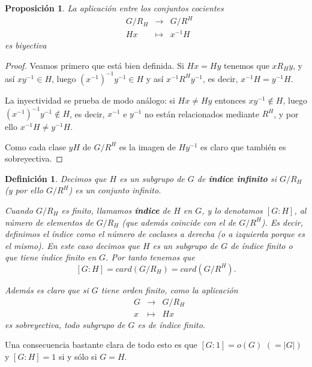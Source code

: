 \documentclass[12pt]{article}
\newtheorem{proposition}[theorem]{Proposición}
\newtheorem{definition}[theorem]{Definición}
\begin{document}
\begin{proposition}La aplicación entre los conjuntos cocientes $$
\begin{array}{rccl}
&G/R_H & \longrightarrow &G/R^H\\
&Hx& \longmapsto &x^{-1}H
\end{array}
$$ es biyectiva
\end{proposition}
\begin{proof}
Veamos primero que está bien definida. Si $Hx = Hy$ tenemos que $xR_Hy$, y así $xy^{-1} \in H$, luego $(x^{-1})^{-1}y^{-1} \in H$ y así $x^{-1}R^Hy^{-1}$, es decir, $x^{-1}H = y^{-1}H.$

La inyectividad se prueba de modo análogo: si $Hx \neq Hy$ entonces $xy^{-1} \notin  H$, luego $(x^{-1})^{-1}y^{-1} \notin H$, es decir, $x^{-1}$ e $y^{-1}$ no están relacionados mediante $R^H$, y por ello $x^{-1}H \neq y^{-1}H$.

Como cada clase $yH$ de $G/R^H$ es la imagen de $Hy^{-1}$ es claro que también es sobreyectiva.

\end{proof}

\begin{definition} \label{eq:indice} Decimos que $H$ es un subgrupo de $G$ de \textbf{índice infinito} si $G/R_{H}$ (y por ello $G/R^{H}$) es un conjunto infinito.


Cuando $G/R_{H}$ es finito, llamamos \textbf{índice} de $H$ en $G$, y lo denotamos $\left[ G:H \right]$, al número de elementos de $G/R_{H}$ (que además coincide con el de $G/R^{H}$). Es decir, definimos el índice como el número de coclases a derecha (o a izquierda porque es el mismo). En este caso decimos que $H$ es un subgrupo de $G$ de índice finito o que tiene índice finito en $G$. Por tanto tenemos que $$\left[ G:H \right] = card(G/R_{H}) = card(G/R^{H}).$$

Además es claro que si $G$ tiene orden finito, como la aplicación $$
\begin{array}{rccl}
&G & \longrightarrow & G/R_{H}\\
&x & \longmapsto &Hx
\end{array}
$$ es sobreyectiva, todo subgrupo de $G$ es de índice finito.
\end{definition}

Una consecuencia bastante clara de todo esto es que $[G:1] = o(G)$  $(=|G|)$ y $[G:H] = 1$ si y sólo si $G = H$.
\end{document}
